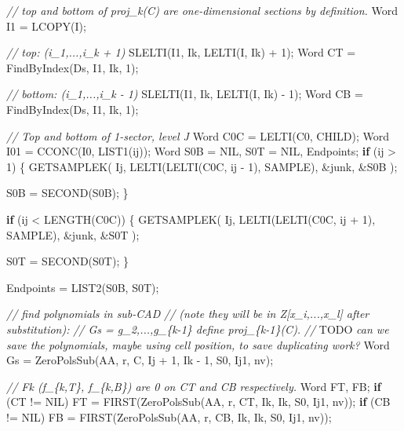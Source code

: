 \documentclass[
]{book}
\newenvironment{Shaded}{\begin{snugshade}}{\end{snugshade}}
\newcommand{\AlertTok}[1]{\textcolor[rgb]{0.94,0.16,0.16}{#1}}
\newcommand{\CommentTok}[1]{\textcolor[rgb]{0.56,0.35,0.01}{\textit{#1}}}
\newcommand{\ControlFlowTok}[1]{\textcolor[rgb]{0.13,0.29,0.53}{\textbf{#1}}}
\newcommand{\DecValTok}[1]{\textcolor[rgb]{0.00,0.00,0.81}{#1}}
\newcommand{\NormalTok}[1]{#1}
\theoremstyle{definition}
\theoremstyle{definition}
\theoremstyle{definition}
\theoremstyle{definition}
\theoremstyle{remark}
\begin{document}
\begin{Shaded}
\begin{Highlighting}[numbers=left,,]
        \CommentTok{// top and bottom of proj\_k(C) are one{-}dimensional sections by definition.}
\NormalTok{        Word I1 = LCOPY(I);}

        \CommentTok{// top: (i\_1,...,i\_k + 1)}
\NormalTok{        SLELTI(I1, Ik, LELTI(I, Ik) + }\DecValTok{1}\NormalTok{);}
\NormalTok{        Word CT = FindByIndex(Ds, I1, Ik, }\DecValTok{1}\NormalTok{);}

        \CommentTok{// bottom: (i\_1,...,i\_k {-} 1)}
\NormalTok{        SLELTI(I1, Ik, LELTI(I, Ik) {-} }\DecValTok{1}\NormalTok{);}
\NormalTok{        Word CB = FindByIndex(Ds, I1, Ik, }\DecValTok{1}\NormalTok{);}

        \CommentTok{// Top and bottom of 1{-}sector, level J}
\NormalTok{        Word C0C = LELTI(C0, CHILD);}
\NormalTok{        Word I01 = CCONC(I0, LIST1(ij));}
\NormalTok{        Word S0B = NIL, S0T = NIL, Endpoints;}
        \ControlFlowTok{if}\NormalTok{ (ij \textgreater{} }\DecValTok{1}\NormalTok{) \{}
\NormalTok{            GETSAMPLEK(}
\NormalTok{                Ij,}
\NormalTok{                LELTI(LELTI(C0C, ij {-} }\DecValTok{1}\NormalTok{), SAMPLE),}
\NormalTok{                \&junk,}
\NormalTok{                \&S0B}
\NormalTok{            );}

\NormalTok{            S0B = SECOND(S0B);}
\NormalTok{        \}}

        \ControlFlowTok{if}\NormalTok{ (ij \textless{} LENGTH(C0C)) \{}
\NormalTok{            GETSAMPLEK(}
\NormalTok{                Ij,}
\NormalTok{                LELTI(LELTI(C0C, ij + }\DecValTok{1}\NormalTok{), SAMPLE),}
\NormalTok{                \&junk,}
\NormalTok{                \&S0T}
\NormalTok{            );}

\NormalTok{            S0T = SECOND(S0T);}
\NormalTok{        \}}

\NormalTok{        Endpoints = LIST2(S0B, S0T);}

        \CommentTok{// find polynomials in sub{-}CAD}
        \CommentTok{// (note they will be in Z[x\_i,...,x\_l] after substitution):}
        \CommentTok{// Gs = g\_2,...,g\_\{k{-}1\} define proj\_\{k{-}1\}(C).}
        \CommentTok{// }\AlertTok{TODO}\CommentTok{ can we save the polynomials, maybe using cell position, to save duplicating work?}
\NormalTok{        Word Gs = ZeroPolsSub(AA, r, C, Ij + }\DecValTok{1}\NormalTok{, Ik {-} }\DecValTok{1}\NormalTok{, S0, Ij1, nv);}

        \CommentTok{// Fk (f\_\{k,T\}, f\_\{k,B\}) are 0 on CT and CB respectively.}
\NormalTok{        Word FT, FB;}
        \ControlFlowTok{if}\NormalTok{ (CT != NIL) FT = FIRST(ZeroPolsSub(AA, r, CT, Ik, Ik, S0, Ij1, nv));}
        \ControlFlowTok{if}\NormalTok{ (CB != NIL) FB = FIRST(ZeroPolsSub(AA, r, CB, Ik, Ik, S0, Ij1, nv));}


\end{Highlighting}
\end{Shaded}
\end{document}
